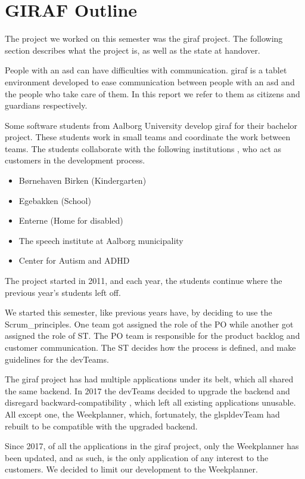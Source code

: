 \chapter{GIRAF Outline}

The project we worked on this semester was the \gls{giraf} project. The following section describes what the project is, as well as the state at handover.

People with an \gls{asd} can have difficulties with communication. \gls{giraf} is a tablet environment developed to ease communication between people with an \gls{asd} and the people who take care of them. In this report we refer to them as \glspl{citizen} and \glspl{guardian} respectively.

Some software students from Aalborg University develop \gls{giraf} for their bachelor project. These students work in small teams and coordinate the work between teams. The students collaborate with the following institutions \cite{GirafWebsite}, who act as customers in the development process.

\begin{itemize}
    \item Børnehaven Birken (Kindergarten) \cite{bhBirken}
    \item Egebakken (School) \cite{egebakken}
    \item Enterne (Home for disabled) \cite{enterne}
    \item The speech institute at Aalborg municipality
    \item Center for Autism and ADHD \cite{center_for_autism}
\end{itemize}

The project started in 2011, and each year, the students continue where the previous year's students left off.

We started this semester, like previous years have, by deciding to use the \gls{Scrum_principles}. One team got assigned the role of the \gls{PO}  while another got assigned the role of \gls{ST}. The \gls{PO} team is responsible for the product backlog and customer communication. The \gls{ST} decides how the process is defined, and make guidelines for the \glspl{devTeam}.

The \gls{giraf} project has had multiple applications under its belt, which all shared the same backend. In 2017 the \glspl{devTeam} decided to upgrade the backend and disregard backward-compatibility \cite{SW608F18}, which left all existing applications unusable. All except one, the Weekplanner, which, fortunately, the glspl{devTeam} had rebuilt to be compatible with the upgraded backend.

Since 2017, of all the applications in the \gls{giraf} project, only the Weekplanner has been updated, and as such, is the only application of any interest to the customers. We decided to limit our development to the Weekplanner.
